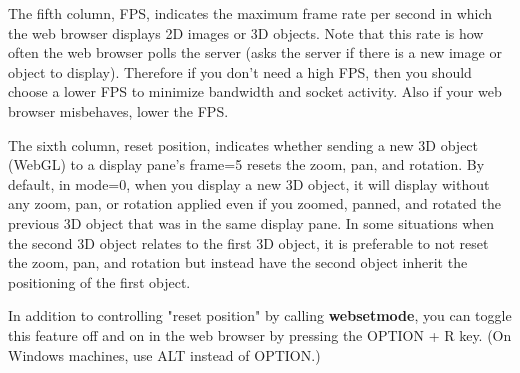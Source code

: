 The fifth column, FPS, indicates the maximum frame rate per second in which the web browser displays
2D images or 3D objects. Note that this rate is how often the web browser polls the server (asks the server if there is a new image or object
to display). Therefore if you don't need a high FPS, then you should choose a lower FPS to minimize bandwidth and socket activity. Also
if your web browser misbehaves, lower the FPS.

The sixth column, reset position, indicates whether sending a new 3D object (WebGL) to a display pane's frame=5 resets the zoom, pan, 
and rotation. By default, in mode=0, when you display a new 3D object, it will display without any zoom, pan, or rotation applied even if you zoomed, 
panned, and rotated the previous 3D object that was in the same display pane. In some situations when the second 3D object
relates to the first 3D object, it is preferable to not reset the zoom, pan, and rotation but instead have the second object inherit the positioning of the
first object.

In addition to controlling "reset position"
by calling \textbf{websetmode}, you can toggle this feature off and on in the web browser by pressing the OPTION + R key. 
(On Windows machines, use ALT instead of OPTION.)

